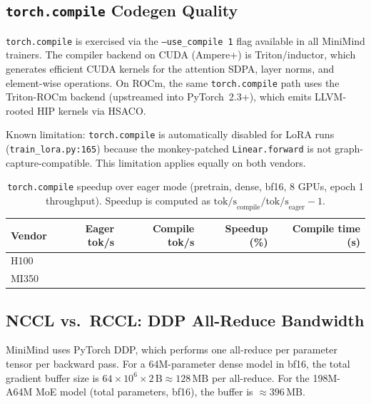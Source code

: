 \subsection{\texttt{torch.compile} Codegen Quality}
\label{sec:crosscutting:compile}

\texttt{torch.compile} is exercised via the \texttt{--use\_compile 1} flag
available in all MiniMind trainers.  The compiler backend on CUDA (Ampere+)
is Triton/inductor, which generates efficient CUDA kernels for the attention
SDPA, layer norms, and element-wise operations.  On ROCm, the same
\texttt{torch.compile} path uses the Triton-ROCm backend (upstreamed into
PyTorch~2.3+), which emits LLVM-rooted HIP kernels via HSACO.

Known limitation: \texttt{torch.compile} is automatically disabled for LoRA
runs (\texttt{train\_lora.py:165}) because the monkey-patched
\texttt{Linear.forward} is not graph-capture-compatible.  This limitation
applies equally on both vendors.

\begin{table}[h]
\centering
\caption{\texttt{torch.compile} speedup over eager mode (pretrain, dense,
bf16, 8 GPUs, epoch 1 throughput).  Speedup is computed as
$\text{tok/s}_{\text{compile}} / \text{tok/s}_{\text{eager}} - 1$.}
\label{tab:compile}
\small
\begin{tabular}{lrrrr}
\toprule
\textbf{Vendor} & \textbf{Eager tok/s} & \textbf{Compile tok/s} & \textbf{Speedup (\%)} & \textbf{Compile time (s)} \\
\midrule
H100  & \PH{} & \PH{} & \PH{} & \PH{} \\
MI350 & \PH{} & \PH{} & \PH{} & \PH{} \\
\bottomrule
\end{tabular}
\end{table}


\subsection{NCCL vs.\ RCCL: DDP All-Reduce Bandwidth}
\label{sec:crosscutting:collective}

MiniMind uses PyTorch DDP, which performs one all-reduce per parameter tensor
per backward pass.  For a 64M-parameter dense model in bf16, the total
gradient buffer size is $64{\times}10^6 \times 2\,\text{B} \approx 128\,\text{MB}$
per all-reduce.  For the 198M-A64M MoE model (total parameters, bf16), the
buffer is $\approx 396\,\text{MB}$.

